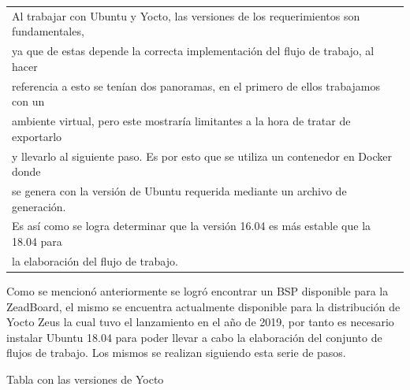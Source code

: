 \documentclass[12pt,letterpaper]{article}
\begin{document}
\begin{table}[h!]
{\begin{tabular}{|l|}
        Al trabajar con Ubuntu y Yocto, las versiones de los requerimientos son fundamentales,\\
        ya que de estas depende la correcta implementación del flujo de trabajo, al hacer \\
        referencia a esto se tenían dos panoramas, en el primero de ellos trabajamos con un \\
        ambiente virtual, pero este mostraría limitantes a la hora de tratar de exportarlo\\
        y llevarlo al siguiente paso. Es por esto que se utiliza un contenedor en Docker donde\\
        se genera con la versión de Ubuntu requerida mediante un archivo de generación.\\
        
        Es así como se logra determinar que la versión 16.04 es más estable que la 18.04 para\\
        la elaboración del flujo de trabajo.\\ \hline \hline  
    \end{tabular}}
\end{table}

Como se mencionó anteriormente se logró encontrar un BSP disponible para la ZeadBoard, el mismo
se encuentra actualmente disponible para la distribución de Yocto Zeus la cual tuvo el lanzamiento 
en el año de 2019, por tanto es necesario instalar Ubuntu 18.04 para poder llevar a cabo la elaboración
del conjunto de flujos de trabajo. Los mismos se realizan siguiendo esta serie de pasos. 

Tabla con las versiones de Yocto
\end{document}
